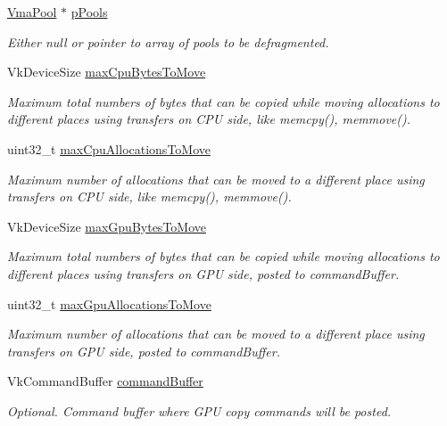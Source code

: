 \begin{DoxyCompactItemize}
\hyperlink{structVmaPool}{Vma\+Pool} $\ast$ \hyperlink{structVmaDefragmentationInfo2_a0b3effd57f3fcdeb2ed62210b4ef20e1}{p\+Pools}
\begin{DoxyCompactList}\small\item\em Either null or pointer to array of pools to be defragmented. \end{DoxyCompactList}\item 
Vk\+Device\+Size \hyperlink{structVmaDefragmentationInfo2_af78e1ea40c22d85137b65f6b384a4d0a}{max\+Cpu\+Bytes\+To\+Move}
\begin{DoxyCompactList}\small\item\em Maximum total numbers of bytes that can be copied while moving allocations to different places using transfers on C\+PU side, like {\ttfamily memcpy()}, {\ttfamily memmove()}. \end{DoxyCompactList}\item 
uint32\+\_\+t \hyperlink{structVmaDefragmentationInfo2_a94c2c7223d52878445a8cccce396b671}{max\+Cpu\+Allocations\+To\+Move}
\begin{DoxyCompactList}\small\item\em Maximum number of allocations that can be moved to a different place using transfers on C\+PU side, like {\ttfamily memcpy()}, {\ttfamily memmove()}. \end{DoxyCompactList}\item 
Vk\+Device\+Size \hyperlink{structVmaDefragmentationInfo2_a4ddbc898d0afe1518f863a3763628f08}{max\+Gpu\+Bytes\+To\+Move}
\begin{DoxyCompactList}\small\item\em Maximum total numbers of bytes that can be copied while moving allocations to different places using transfers on G\+PU side, posted to {\ttfamily command\+Buffer}. \end{DoxyCompactList}\item 
uint32\+\_\+t \hyperlink{structVmaDefragmentationInfo2_a40d53d33e71ba0b66f844ed63c05a3f6}{max\+Gpu\+Allocations\+To\+Move}
\begin{DoxyCompactList}\small\item\em Maximum number of allocations that can be moved to a different place using transfers on G\+PU side, posted to {\ttfamily command\+Buffer}. \end{DoxyCompactList}\item 
Vk\+Command\+Buffer \hyperlink{structVmaDefragmentationInfo2_a7f71f39590c5316771493d2333f9c1bd}{command\+Buffer}
\begin{DoxyCompactList}\small\item\em Optional. Command buffer where G\+PU copy commands will be posted. \end{DoxyCompactList}\end{DoxyCompactItemize}


